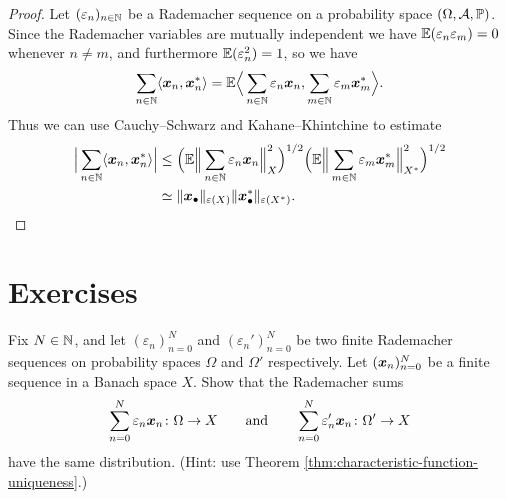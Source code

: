 \begin{proof}
  Let $(\varepsilon_{n})_{n \in \mathbb{N}}$ be a Rademacher sequence on a probability space $(\Omega,\mathcal{A},\mathbb{P})$.
  Since the Rademacher variables are mutually independent we have $\mathbb{E}(\varepsilon_{n} \varepsilon_m) = 0$ whenever $n \neq m$, and furthermore $\mathbb{E}(\varepsilon_{n}^{2}) = 1$, so we have
  \begin{equation*}
    \sum_{n \in \mathbb{N}} \langle \bm{x}_{n}, \bm{x}_{n}^{*} \rangle
    = \mathbb{E} \Big\langle \sum_{n \in \mathbb{N}} \varepsilon_{n} \bm{x}_{n}, \sum_{m \in \mathbb{N}} \varepsilon_{m} \bm{x}_{m}^{*} \Big\rangle.
  \end{equation*}
  Thus we can use Cauchy--Schwarz and Kahane--Khintchine to estimate
    \begin{equation*}
      \begin{aligned}
        \Big|\sum_{n \in \mathbb{N}} \langle \bm{x}_{n}, \bm{x}_{n}^{*} \rangle \Big|
        &\leq \Big( \mathbb{E} \Big\| \sum_{n \in \mathbb{N}} \varepsilon_{n} \bm{x}_{n} \Big\|_{X}^{2} \Big)^{1/2} 
        \Big( \mathbb{E} \Big\| \sum_{m \in \mathbb{N}} \varepsilon_{m} \bm{x}_{m}^{*} \Big\|_{X^{*}}^{2} \Big)^{1/2} \\
        & \simeq \|\bm{x}_{\bullet}\|_{\varepsilon(X)} \|\bm{x}_{\bullet}^{*}\|_{\varepsilon(X^{*})} .
      \end{aligned}
    \end{equation*}
\end{proof}







\section*{Exercises}

\begin{exercise}\label{ex:rad-sum-dist}
  Fix $N \in \mathbb{N}$, and let $(\varepsilon_{n})_{n=0}^{N}$ and $(\varepsilon_{n}')_{n=0}^{N}$ be two finite Rademacher sequences on probability spaces $\Omega$ and $\Omega'$ respectively.
  Let $(\bm{x}_{n})_{n=0}^{N}$ be a finite sequence in a Banach space $X$.
  Show that the Rademacher sums
  \begin{equation*}
    \sum_{n = 0}^{N} \varepsilon_n \bm{x}_{n} \colon \Omega \to X \qquad \text{and} \qquad
    \sum_{n = 0}^{N} \varepsilon_n' \bm{x}_{n} \colon \Omega' \to X
  \end{equation*}
  have the same distribution.
  (Hint: use Theorem \ref{thm:characteristic-function-uniqueness}.) 
\end{exercise}

